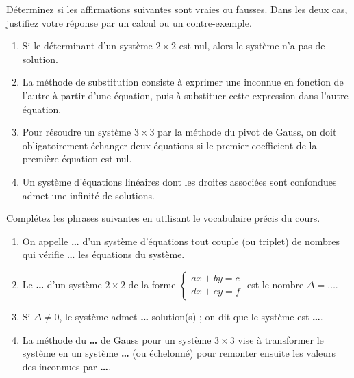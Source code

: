 \documentclass[11pt]{article}
\begin{document}
\begin{exercice}
Déterminez si les affirmations suivantes sont vraies ou fausses. Dans les deux cas, justifiez votre réponse par un calcul ou un contre-exemple.
\begin{enumerate}
\item Si le déterminant d'un système $2 \times 2$ est nul, alors le système n'a pas de solution.
\item La méthode de substitution consiste à exprimer une inconnue en fonction de l'autre à partir d'une équation, puis à substituer cette expression dans l'autre équation.
\item Pour résoudre un système $3 \times 3$ par la méthode du pivot de Gauss, on doit obligatoirement échanger deux équations si le premier coefficient de la première équation est nul.
\item Un système d'équations linéaires dont les droites associées sont confondues admet une infinité de solutions.
\end{enumerate}
\end{exercice}

\begin{exercice}
Complétez les phrases suivantes en utilisant le vocabulaire précis du cours.
\begin{enumerate}
\item On appelle \textbf{\dots} d'un système d'équations tout couple (ou triplet) de nombres qui vérifie \textbf{\dots} les équations du système.
\item Le \textbf{\dots} d'un système $2 \times 2$ de la forme $\begin{cases} ax+by=c \\ dx+ey=f \end{cases}$ est le nombre $\Delta = \dots$.
\item Si $\Delta \neq 0$, le système admet \textbf{\dots} solution(s) ; on dit que le système est \textbf{\dots}.
\item La méthode du \textbf{\dots} de Gauss pour un système $3 \times 3$ vise à transformer le système en un système \textbf{\dots} (ou échelonné) pour remonter ensuite les valeurs des inconnues par \textbf{\dots}.
\end{enumerate}
\end{exercice}
\end{document}
